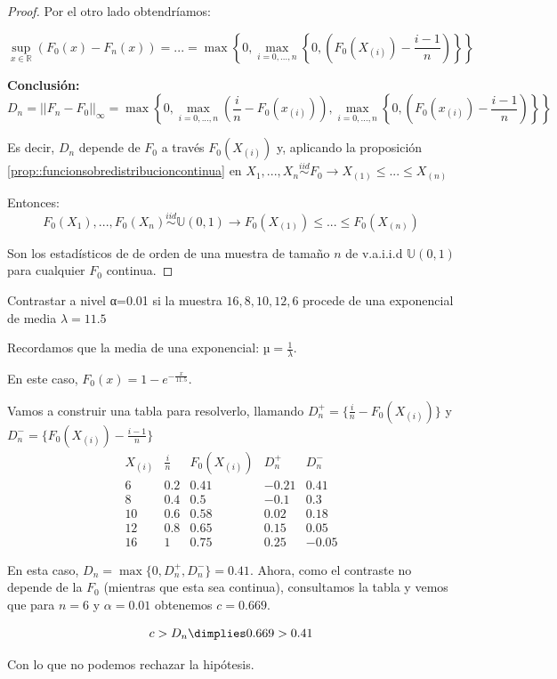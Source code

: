 \begin{proof}
Por el otro lado obtendríamos:

\[
\sup_{x\in ℝ} (F_0(x) - F_n(x)) = ... = \max \left\{0,\max_{i=0,...,n} \left\{0, \left(F_0(X_{(i)}) - \frac{i-1}{n}\right)\right\}\right\}
\]

\textbf{Conclusión:}
\[D_n = ||F_n - F_0||_{\infty} = \max \left\{ 0, \max_{i=0,...,n} \left( \frac{i}{n} - F_0(x_{(i)})\right), \max_{i=0,...,n} \left\{0, \left(F_0(x_{(i)}) - \frac{i-1}{n}\right)\right\}\right\}\]

Es decir, $D_n$ depende de $F_0$ a través $F_0(X_{(i)})$ y, aplicando la proposición \ref{prop::funcionsobredistribucioncontinua} en $X_1,...,X_n \overset{iid}{\sim} F_0 \to X_{(1)} \leq ... \leq X_{(n)}$

Entonces: 
\[
F_0(X_1),...,F_0(X_n) \overset{iid}{\sim} \mathbb{U}(0,1) \to F_0(X_{(1)})\leq ... \leq F_0(X_{(n)})
\]


Son los estadísticos de de orden de una muestra de tamaño $n$ de v.a.i.i.d $\mathbb{U}(0,1)$ para cualquier $F_0$ continua.

\end{proof}

\begin{example}
Contrastar a nivel α=0.01 si la muestra $16,8,10,12,6$ procede de una exponencial de media $λ=11.5$

Recordamos que la media de una exponencial: $µ = \frac{1}{λ}$.

En este caso, $F_0(x) = 1-e^{-\frac{x}{11.5}}$.


Vamos a construir una tabla para resolverlo, llamando $D_n^+ = \{\frac{i}{n} - F_0(X_{(i)})\}$ y $D_n^- = \{F_0(X_{(i)}) - \frac{i-1}{n} \}$
\[
\begin{array}{cccccc}
X_{(i)} & \frac{i}{n} & F_0(X_{(i)}) & D_n^+ & D_n^-\\\hline
6&0.2&0.41&-0.21&0.41\\
8&0.4&0.5&-0.1&0.3 \\
10&0.6&0.58&0.02&0.18 \\
12&0.8&0.65&0.15&0.05 \\
16&1&0.75&0.25&-0.05
\end{array}\]


En esta caso, $D_n = \max\{0,D_n^+,D_n^-\} = 0.41$. Ahora, como el contraste no depende de la $F_0$ (mientras que esta sea continua), consultamos la tabla y vemos que para $n=6$ y $α=0.01$ obtenemos $c=0.669$.

\[c>D_n \dimplies 0.669 > 0.41\]

Con lo que no podemos rechazar la hipótesis.

\end{example}

